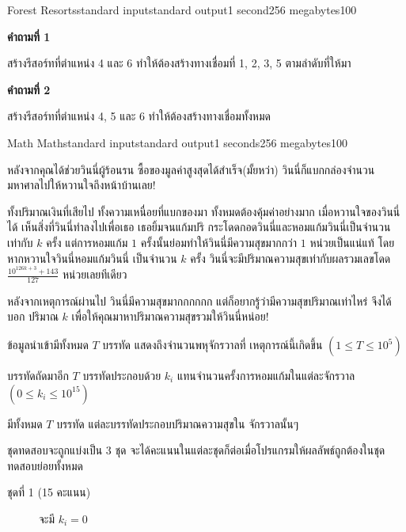 \documentclass[11pt,a4paper]{article}
\begin{document}
\begin{problem}{Forest Resorts}{standard input}{standard output}{1 second}{256 megabytes}{100}
\Example

\begin{example}
%
\end{example}

\Note
\textbf{คำถามที่ 1}

สร้างรีสอร์ทที่ตำแหน่ง 4 และ 6 ทำให้ต้องสร้างทางเชื่อมที่ 1, 2, 3, 5 ตามลำดับที่ให้มา

\textbf{คำถามที่ 2}
  
สร้างรีสอร์ทที่ตำแหน่ง 4, 5 และ 6 ทำให้ต้องสร้างทางเชื่อมทั้งหมด
  
\end{problem}


\pagebreak

\begin{problem}{Math Math}{standard input}{standard output}{1 seconds}{256 megabytes}{100}

  หลังจากคุณได้ช่วยวินนี่ผู้ร้อนรน ซื้อของมูลค่าสูงสุดได้สำเร็จ(มั้ยหว่า) วินนี่ก็แบกกล่องจำนวนมหาศาลไปให้หวานใจถึงหน้าบ้านเลย!
  
  ทั้งปริมาณเงินที่เสียไป ทั้งความเหนื่อยที่แบกของมา ทั้งหมดต้องคุ้มค่าอย่างมาก เมื่อหวานใจของวินนี่ได้ เห็นสิ่งที่วินนี่ทำลงไปเพื่อเธอ
  เธอยิ้มจนแก้มปริ กระโดดกอดวินนี่และหอมแก้มวินนี่เป็นจำนวนเท่ากับ $k$ ครั้ง แต่การหอมแก้ม $1$ ครั้งนั้นย่อมทำให้วินนี่มีความสุขมากกว่า $1$ หน่วยเป็นแน่แท้ 
  โดยหากหวานใจวินนี่หอมแก้มวินนี่ เป็นจำนวน $k$ ครั้ง วินนี่จะมีปริมาณความสุขเท่ากับผลรวมเลขโดด $\frac{10^{126k + 3} + 143}{127}$ หน่วยเลยทีเดียว
  
  หลังจากเหตุการณ์ผ่านไป วินนี่มีความสุขมากกกกกก แต่ก็อยากรู้ว่ามีความสุขปริมาณเท่าไหร่ จึงได้บอก ปริมาณ $k$ เพื่อให้คุณมาหาปริมาณความสุขรวมให้วินนี่หน่อย!
  
  \InputFile
  ข้อมูลนำเข้ามีทั้งหมด $T$ บรรทัด แสดงถึงจำนวนพหุจักรวาลที่ เหตุการณ์นี้เกิดขึ้น $(1 \leq T \leq 10^5)$
  
  บรรทัดถัดมาอีก $T$ บรรทัดประกอบด้วย $k_i$ แทนจำนวนครั้งการหอมแก้มในแต่ละจักรวาล $(0 \leq k_i \leq 10^{15})$ 
  
  \OutputFile
  มีทั้งหมด $T$ บรรทัด แต่ละบรรทัดประกอบปริมาณความสุขใน จักรวาลนั้นๆ
  
  \Scoring
  ชุดทดสอบจะถูกแบ่งเป็น 3 ชุด จะได้คะแนนในแต่ละชุดก็ต่อเมื่อโปรแกรมให้ผลลัพธ์ถูกต้องในชุดทดสอบย่อยทั้งหมด
  
  \begin{description}
  
  \item[ชุดที่ 1 (15 คะแนน)] จะมี $k_i = 0$
  

\end{description}
\end{problem}
\end{document}

